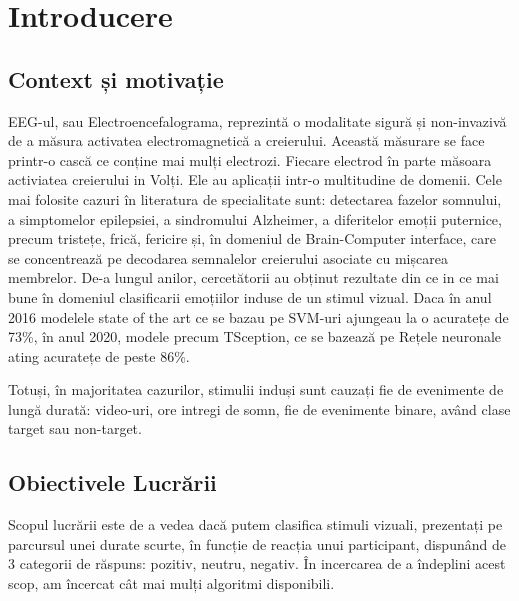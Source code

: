 \chapter{Introducere}

\section{Context și motivație}
EEG-ul, sau Electroencefalograma, reprezintă o modalitate sigură și non-invazivă de a măsura activatea electromagnetică a creierului. Această măsurare se face printr-o cască ce conține mai mulți electrozi. Fiecare electrod în parte măsoara activiatea creierului in Volți. Ele au aplicații intr-o multitudine de domenii. Cele mai folosite cazuri în literatura de specialitate sunt: detectarea fazelor somnului, a simptomelor epilepsiei, a sindromului Alzheimer, a diferitelor emoții puternice, precum tristețe, frică, fericire și, în domeniul de Brain-Computer interface, care se concentrează pe decodarea semnalelor creierului asociate cu mișcarea membrelor.
De-a lungul anilor, cercetătorii au obținut rezultate din ce in ce mai bune în domeniul clasificarii emoțiilor induse de un stimul vizual. Daca în anul 2016 modelele state of the art ce se bazau pe SVM-uri ajungeau la o acuratețe de 73\%\cite{ATKINSON201635}, în anul 2020, modele precum TSception, ce se bazează pe Rețele neuronale ating acuratețe de peste 86\%\cite{TSception}. 

Totuși, în majoritatea cazurilor, stimulii induși sunt cauzați fie de evenimente de lungă durată: video-uri, ore intregi de somn, fie de evenimente binare, având clase target sau non-target.

\section{Obiectivele Lucrării}
Scopul lucrării este de a vedea dacă putem clasifica stimuli vizuali, prezentați pe parcursul unei durate scurte, în funcție de reacția unui participant, dispunând de 3 categorii de răspuns: pozitiv, neutru, negativ. În incercarea de a îndeplini acest scop, am încercat cât mai mulți algoritmi disponibili.
